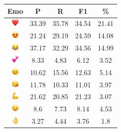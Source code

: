 \documentclass{article}
\begin{document}
\begin{table}
\centering
\begin{tabular}{|c|ccc|c|} \hline
\textbf{Emo} & \textbf{P} & \textbf{R} & \textbf{F1} & \textbf{\%} \\ \hline
\includegraphics[height=0.37cm,width=0.37cm]{img/red_heart.png} & 33.39 & 35.78 & 34.54 & 21.41\\ 
\includegraphics[height=0.37cm,width=0.37cm]{img/smiling_face_with_hearteyes.png} & 21.24 & 29.19 & 24.59 & 14.08\\ 
\includegraphics[height=0.37cm,width=0.37cm]{img/face_with_tears_of_joy.png} & 37.17 & 32.29 & 34.56 & 14.99\\ 
\includegraphics[height=0.37cm,width=0.37cm]{img/two_hearts.png} & 8.33 & 4.83 & 6.12 & 3.52\\ 
\includegraphics[height=0.37cm,width=0.37cm]{img/smiling_face_with_smiling_eyes.png} & 10.62 & 15.56 & 12.63 & 5.14\\ 
\includegraphics[height=0.37cm,width=0.37cm]{img/face_blowing_a_kiss.png} & 11.78 & 10.33 & 11.01 & 3.97\\ 
\includegraphics[height=0.37cm,width=0.37cm]{img/flexed_biceps.png} & 21.62 & 20.85 & 21.23 & 3.07\\ 
\includegraphics[height=0.37cm,width=0.37cm]{img/winking_face.png} & 8.6 & 7.73 & 8.14 & 4.53\\ 
\includegraphics[height=0.37cm,width=0.37cm]{img/OK_hand.png} & 3.27 & 4.44 & 3.76 & 1.8\\ 

\end{tabular}
\end{table}
\end{document}
